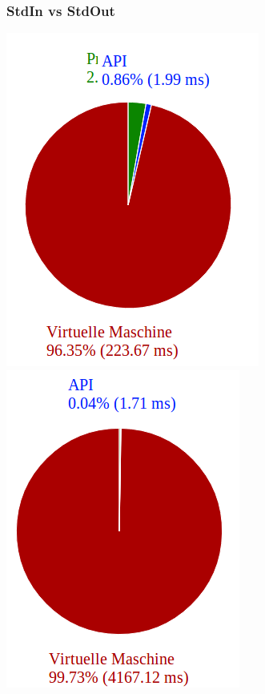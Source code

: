 \begin{frame}
\frametitle{StdIn vs StdOut}
\begin{center}
	\includegraphics[scale=0.3]{performance/100-turns.png}
	\includegraphics[scale=0.3]{performance/100-looks.png}
\end{center}

\end{frame}

